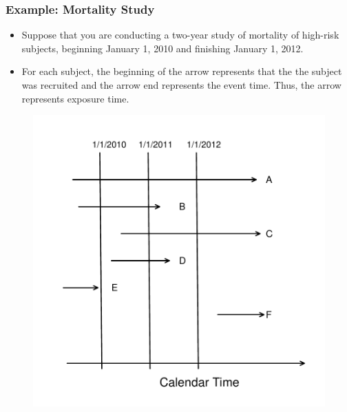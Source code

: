 \documentclass{beamer}
\begin{document}
\begin{frame}%
\frametitle{Example: Mortality Study}
\begin{itemize} 
\item Suppose that you are conducting a two-year study of mortality of high-risk subjects, beginning January
1, 2010 and finishing January 1, 2012.
\item For each subject, the beginning of the arrow represents that the the subject was recruited and the arrow end represents the event time. Thus, the
arrow represents exposure time.
\end{itemize}
\vspace{-.1in}
\begin{figure}[htp]
  \begin{center}
    \includegraphics[width=.5\textwidth]{Figures/F14Mortality.pdf}
  \end{center}
\end{figure}
\end{frame}
\end{document}
